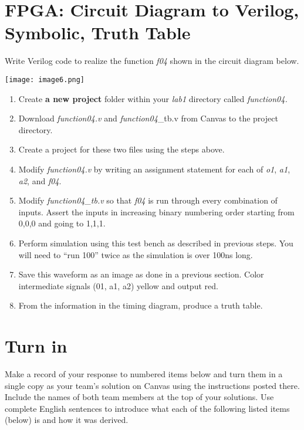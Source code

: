 \section{FPGA: Circuit Diagram to Verilog, Symbolic, Truth Table}

Write Verilog code to realize the function \emph{f04} shown in the
circuit diagram below.

\texttt{[image: image6.png]}

\begin{enumerate}
        \def\labelenumi{\arabic{enumi}.}
    \item
        Create \textbf{a new project} folder within your \emph{lab1} directory
        called \emph{function04.}
    \item
        Download \emph{function04.v} and \emph{function04}\_tb.v from Canvas
        to the project directory.
    \item
        Create a project for these two files using the steps above.
    \item
        \protect\hypertarget{Part_4_Step_4}{}{}Modify \emph{function04.v} by
        writing an assignment statement for each of \emph{o1}, \emph{a1},
        \emph{a2}, and \emph{f04}.
    \item
        Modify \emph{function04\_tb.v} so that \emph{f04} is run through every
        combination of inputs. Assert the inputs in increasing binary
        numbering order starting from 0,0,0 and going to 1,1,1.
    \item
        Perform simulation using this test bench as described in previous
        steps. You will need to ``run 100'' twice as the simulation is over
        100ns long.
    \item
        \protect\hypertarget{Part_4_Step_7}{}{}Save this waveform as an image
        as done in a previous section. Color intermediate signals (01, a1, a2)
        yellow and output red.
    \item
        \protect\hypertarget{Part_4_Step_8}{}{}From the information in the
        timing diagram, produce a truth table.
\end{enumerate}

\section{Turn in}

Make a record of your response to numbered items below and turn them in
a single copy as your team's solution on Canvas using the instructions
posted there. Include the names of both team members at the top of your
solutions. Use complete English sentences to introduce what each of the
following listed items (below) is and how it was derived.


